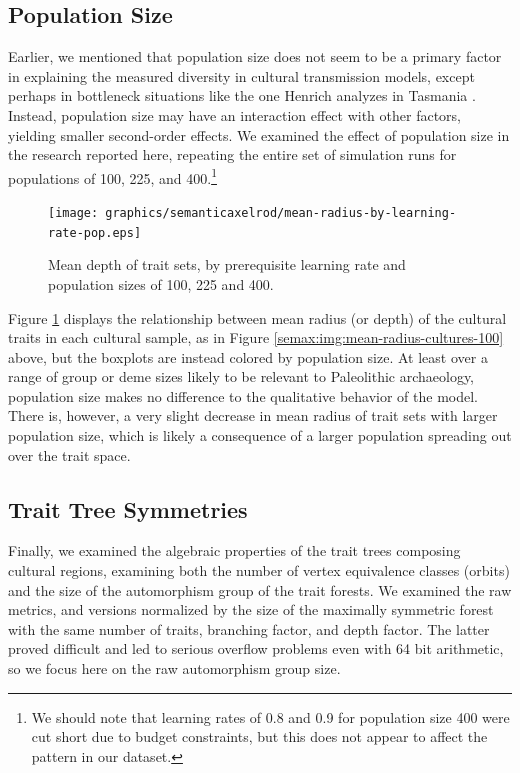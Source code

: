 \subsection{Population Size}\label{semax:sec:population-size}

Earlier, we mentioned that population size does not seem to be a primary
factor in explaining the measured diversity in cultural transmission
models, except perhaps in bottleneck situations like the one Henrich
analyzes in Tasmania \citeyearpar{henrich2004}. Instead, population size
may have an interaction effect with other factors, yielding smaller
second-order effects. We examined the effect of population size in the
research reported here, repeating the entire set of simulation runs for
populations of 100, 225, and 400.\footnote{We should note that learning
  rates of 0.8 and 0.9 for population size 400 were cut short due to
  budget constraints, but this does not appear to affect the pattern in
  our dataset.}

\begin{figure}[htbp] 
\centering 
\texttt{[image: graphics/semanticaxelrod/mean-radius-by-learning-rate-pop.eps]} 
\caption{Mean depth of trait sets, by prerequisite learning rate and population sizes of 100, 225 and 400.} 
\label{semax:img:mean-radius-cultures-pop} 
\end{figure}

Figure \ref{semax:img:mean-radius-cultures-pop} displays the relationship
between mean radius (or depth) of the cultural traits in each cultural
sample, as in Figure \ref{semax:img:mean-radius-cultures-100} above, but the
boxplots are instead colored by population size. At least over a range
of group or deme sizes likely to be relevant to Paleolithic archaeology,
population size makes no difference to the qualitative behavior of the
model. There is, however, a very slight decrease in mean radius of trait
sets with larger population size, which is likely a consequence of a
larger population spreading out over the trait space.

\subsection{Trait Tree Symmetries}\label{semcax:sec:trait-tree-symmetries}

Finally, we examined the algebraic properties of the trait trees
composing cultural regions, examining both the number of vertex
equivalence classes (orbits) and the size of the automorphism group of
the trait forests. We examined the raw metrics, and versions normalized
by the size of the maximally symmetric forest with the same number of
traits, branching factor, and depth factor. The latter proved difficult
and led to serious overflow problems even with 64 bit arithmetic, so we
focus here on the raw automorphism group size.


